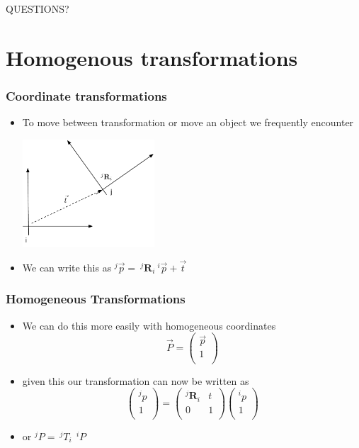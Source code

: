 \documentclass[10pt]{beamer}
\begin{document}
\begin{frame}
  \centerline{\Huge QUESTIONS?}
\end{frame}

\section{Homogenous transformations}

\begin{frame}
  \frametitle{Coordinate transformations}
  \begin{itemize}
  \item To move between transformation or move an object we frequently encounter
    \centerline{\includegraphics[height=4cm]{geometric-transformation}}
  \item We can write this as $^{j}\vec{p} = ~^{j}\mathbf{R}_i ~^{i}\vec{p} + \vec{t}$
  \end{itemize}
\end{frame}

\begin{frame}
  \frametitle{Homogeneous Transformations}
  \begin{itemize}
  \item We can do this more easily with homogeneous coordinates
    \[
      \vec{P} = \left(
        \begin{array}{c}
          \vec{p} \\ 1 \\
        \end{array}
      \right)
    \]
  \item given this our transformation can now be written as
    \[
      \left(
        \begin{array}{c}
          ^{j}p \\ 1 \\ 
        \end{array}
      \right)
      =
      \left(
        \begin{array}{cc}
          ^{j}\mathbf{R}_i & t \\
          0                & 1 \\          
        \end{array}
      \right)
      \left(
        \begin{array}{c}
          ^{i}p \\ 1 \\ 
        \end{array}
      \right)
    \]
  \item or $ ^{j}P = ~^{j}T_{i} ~~ ^{i}P$

  \end{itemize}
\end{frame}
\end{document}
